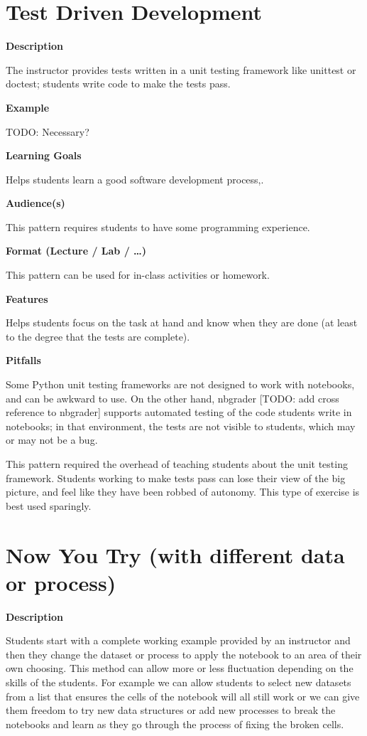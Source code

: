 \documentclass[]{book}
\begin{document}
\section{Test Driven Development}\label{test-driven-development}

\textbf{Description}

The instructor provides tests written in a unit testing framework like
unittest or doctest; students write code to make the tests pass.

\textbf{Example}

TODO: Necessary?

\textbf{Learning Goals}

Helps students learn a good software development process,.

\textbf{Audience(s)}

This pattern requires students to have some programming experience.

\textbf{Format (Lecture / Lab / \ldots{})}

This pattern can be used for in-class activities or homework.

\textbf{Features}

Helps students focus on the task at hand and know when they are done (at
least to the degree that the tests are complete).

\textbf{Pitfalls}

Some Python unit testing frameworks are not designed to work with
notebooks, and can be awkward to use. On the other hand, nbgrader
{[}TODO: add cross reference to nbgrader{]} supports automated testing
of the code students write in notebooks; in that environment, the tests
are not visible to students, which may or may not be a bug.

This pattern required the overhead of teaching students about the unit
testing framework. Students working to make tests pass can lose their
view of the big picture, and feel like they have been robbed of
autonomy. This type of exercise is best used sparingly.

\section{Now You Try (with different data or
process)}\label{now-you-try-with-different-data-or-process}

\textbf{Description}

Students start with a complete working example provided by an instructor
and then they change the dataset or process to apply the notebook to an
area of their own choosing. This method can allow more or less
fluctuation depending on the skills of the students. For example we can
allow students to select new datasets from a list that ensures the cells
of the notebook will all still work or we can give them freedom to try
new data structures or add new processes to break the notebooks and
learn as they go through the process of fixing the broken cells.
\end{document}
